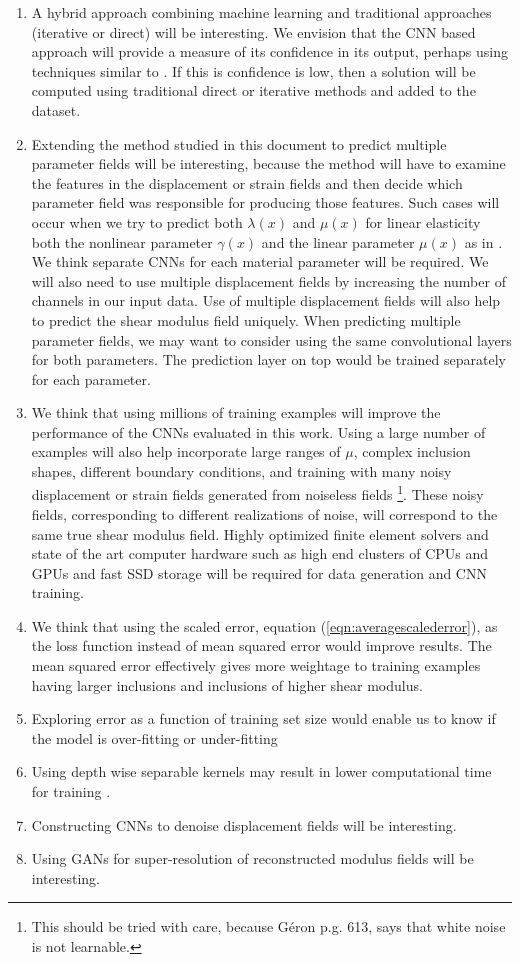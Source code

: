 \documentclass[12pt]{article}
\begin{document}
\begin{enumerate}
\item{A hybrid approach combining machine learning and traditional approaches (iterative or direct) will be interesting. We envision that the CNN based approach will provide a measure of its confidence in its output, perhaps using techniques similar to \cite{paper:patel2021}. If this is confidence is low, then a solution will be computed using traditional direct or iterative methods and added to the dataset.}
\item{Extending the method studied in this document to predict multiple parameter fields will be interesting, because the method will have to examine the features in the displacement or strain fields and then decide which parameter field was responsible for producing those features. Such cases will occur when we try to predict both $\lambda(x)$ and $\mu(x)$ for linear elasticity both the nonlinear parameter $\gamma(x)$ and the linear parameter $\mu(x)$ as in \cite{paper:gokhale2008}. We think separate CNNs for each material parameter will be required. We will also need to use multiple displacement fields \cite{paper:barbonegokhale,paper:barbonebamber} by increasing the number of channels in our input data. Use of multiple displacement fields will also help to predict the shear modulus field uniquely. When predicting multiple parameter fields, we may want to consider using the same convolutional layers for both parameters. The prediction layer on top would be trained separately for each parameter.}
\item{We think that using millions of training examples will improve the performance of the CNNs evaluated in this work. Using a large number of examples will also help incorporate large ranges of $\mu$, complex inclusion shapes, different boundary conditions, and training with many noisy displacement or strain fields generated from noiseless fields \footnote{This should be tried with care, because G\'{e}ron \cite{book:geron2019} p.g. 613, says that white noise is not learnable.}. These noisy fields, corresponding to different realizations of noise, will correspond to the same true shear modulus field. Highly optimized finite element solvers and state of the art computer hardware such as high end clusters of CPUs and GPUs and fast SSD storage will be required for data generation and CNN training.}
\item{We think that using the scaled error, equation (\ref{eqn:averagescalederror}), as the loss function instead of mean squared error would improve results. The mean squared error effectively gives more weightage to training examples having larger inclusions and inclusions of higher shear modulus.}
\item{Exploring error as a function of training set size would enable us to know if the model is over-fitting or under-fitting}
\item{Using depth wise separable kernels may result in lower computational time for training \cite{misc:sepconv}.}
\item{Constructing CNNs to denoise displacement fields will be interesting.}
\item{Using GANs for super-resolution of reconstructed modulus fields will be interesting.}
\end{enumerate}
\end{document}

